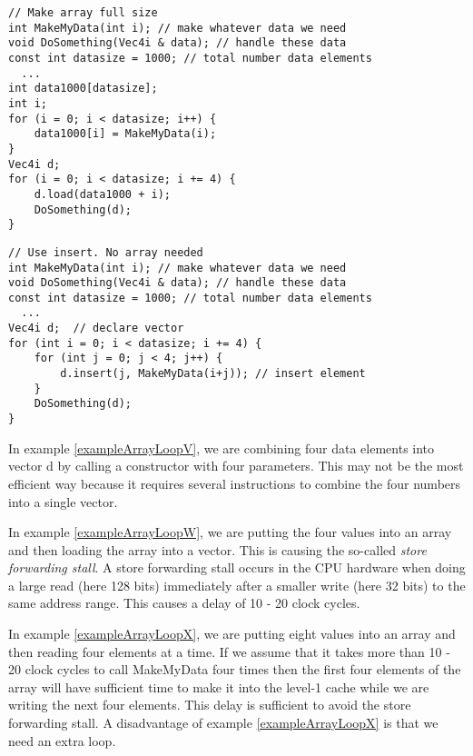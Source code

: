 \documentclass[vcl_manual.tex]{subfiles}
\begin{document}
\begin{example}
\label{exampleArrayLoopY}
\end{example}
\begin{lstlisting}[frame=single]
// Make array full size
int MakeMyData(int i); // make whatever data we need
void DoSomething(Vec4i & data); // handle these data
const int datasize = 1000; // total number data elements
  ...
int data1000[datasize];
int i;
for (i = 0; i < datasize; i++) {
    data1000[i] = MakeMyData(i); 
}
Vec4i d;
for (i = 0; i < datasize; i += 4) {
    d.load(data1000 + i);
    DoSomething(d);
}
\end{lstlisting}

\begin{example}
\label{exampleArrayLoopInsert}
\end{example}
\begin{lstlisting}[frame=single]
// Use insert. No array needed
int MakeMyData(int i); // make whatever data we need
void DoSomething(Vec4i & data); // handle these data
const int datasize = 1000; // total number data elements
  ...
Vec4i d;  // declare vector
for (int i = 0; i < datasize; i += 4) {
    for (int j = 0; j < 4; j++) {
        d.insert(j, MakeMyData(i+j)); // insert element
    }
    DoSomething(d);
}
\end{lstlisting}

In example \ref{exampleArrayLoopV}, we are combining four data elements into vector d by calling a constructor with four parameters. This may not be the most efficient way because it requires several instructions to combine the four numbers into a single vector.

In example \ref{exampleArrayLoopW}, we are putting the four values into an array and then loading the array into a vector. This is causing the so-called \emph{store forwarding stall}. A store forwarding stall occurs in the CPU hardware when doing a large read (here 128 bits) immediately after a smaller write (here 32 bits) to the same address range. This causes a delay of 10 - 20 clock cycles.

In example \ref{exampleArrayLoopX}, we are putting eight values into an array and then reading four elements at a time. If we assume that it takes more than 10 - 20 clock cycles to call MakeMyData four times then the first four elements of the array will have sufficient time to make it into the level-1 cache while we are writing the next four elements. This delay is sufficient to avoid the store forwarding stall. A disadvantage of example \ref{exampleArrayLoopX} is that we need an extra loop.
\end{document}

